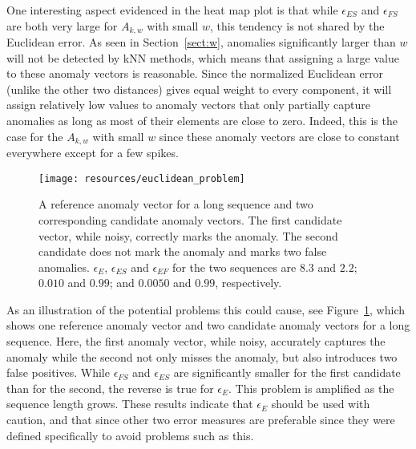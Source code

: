 One interesting aspect evidenced in the heat map plot is that while $\epsilon_{ES}$ and $\epsilon_{FS}$ are both very large for $A_{k,w}$ with small $w$, this tendency is not shared by the Euclidean error. As seen in Section~\ref{sect:w}, anomalies significantly larger than $w$ will not be detected by kNN methods, which means that assigning a large value to these anomaly vectors is reasonable. Since the normalized Euclidean error (unlike the other two distances) gives equal weight to every component, it will assign relatively low values to anomaly vectors that only partially capture anomalies as long as most of their elements are close to zero.  Indeed, this is the case for the $A_{k,w}$ with small $w$ since these anomaly vectors are close to constant everywhere except for a few spikes.

\begin{figure}[ht]
    \vspace{-5pt}
    \begin{center}
        \texttt{[image: resources/euclidean\_problem]}
    \end{center}
    \vspace{-20pt}
    \caption{\small{A reference anomaly vector for a long sequence and two corresponding candidate anomaly vectors. The first candidate vector, while noisy, correctly marks the anomaly. The second candidate does not mark the anomaly and marks two false anomalies. $\epsilon_{E}$, $\epsilon_{ES}$ and $\epsilon_{EF}$ for the two sequences are $8.3$ and $2.2$; $0.010$ and $0.99$; and $0.0050$ and $0.99$, respectively.}}
\label{fig:euclidean_problem}
    \vspace{-10pt}
\end{figure}

As an illustration of the potential problems this could cause, see Figure~\ref{fig:euclidean_problem}, which shows one reference anomaly vector and two candidate anomaly vectors for a long sequence. Here, the first anomaly vector, while noisy, accurately captures the anomaly while the second not only misses the anomaly, but also introduces two false positives. While $\epsilon_{FS}$ and $\epsilon_{ES}$ are significantly smaller for the first candidate than for the second, the reverse is true for $\epsilon_E$. This problem is amplified as the sequence length grows. These results indicate that $\epsilon_E$ should be used with caution, and that since other two error measures are preferable since they were defined specifically to avoid problems such as this.

